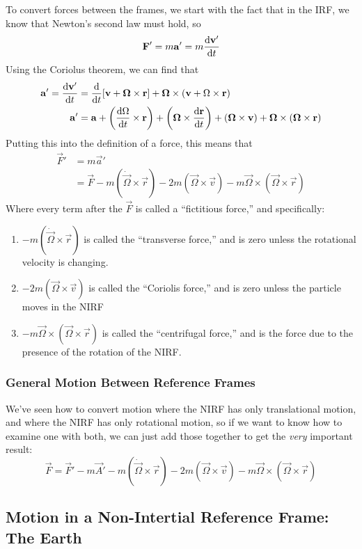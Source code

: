 \documentclass[a4paper]{article}
\begin{document}
To convert forces between the frames, we start with the fact that in the IRF,
we know that Newton's second law must hold, so
\[ \boldsymbol{\mathbf{F}}' = m\boldsymbol{\mathbf{a}}' = m\frac{\mathrm{d}\boldsymbol{\mathbf{v}}'}{\mathrm{d} t} \]
Using the Coriolus theorem, we can find that
\begin{align*}
	\boldsymbol{\mathbf{a}}' = \frac{\mathrm{d} \boldsymbol{\mathbf{v}}'}{\mathrm{d} t} &= \frac{\mathrm{d}}{\mathrm{d} t}[\boldsymbol{\mathbf{v}}+\boldsymbol{\mathbf{\Omega}}
	\times\boldsymbol{\mathbf{r}}]+\boldsymbol{\mathbf{\Omega}}\times(\boldsymbol{\mathbf{v}}+\Omega\times\boldsymbol{\mathbf{r}})\\
	\boldsymbol{\mathbf{a}}' &= \boldsymbol{\mathbf{a}} + \left(\frac{\mathrm{d} \Omega}{\mathrm{d} t}\times\boldsymbol{\mathbf{r}}\right)
	+\left(\boldsymbol{\mathbf{\Omega}}\times\frac{\mathrm{d} \boldsymbol{\mathbf{r}}}{\mathrm{d} t}\right)+(\boldsymbol{\mathbf{\Omega}}\times
	\boldsymbol{\mathbf{v}}) + \boldsymbol{\mathbf{\Omega}}\times(\boldsymbol{\mathbf{\Omega}}\times\boldsymbol{\mathbf{r}})
\end{align*}
Putting this into the definition of a force, this means that
\begin{align*}
	\vec{F}' &= m\vec{a}'\\
		 &= \vec{F} - m(\dot{\vec{\Omega}}\times\vec{r}) - 2m(
		\vec{\Omega}\times\vec{v}) - m\vec{\Omega}\times(
		\vec{\Omega}\times\vec{r})
\end{align*}
Where every term after the $\vec{F}$ is called a ``fictitious force,'' and
specifically:
\begin{enumerate}
	\item \(-m(\dot{\vec{\Omega}}\times\vec{r})\) is called the
		``transverse force,'' and is zero unless the rotational
		velocity is changing.
	\item \(-2m(\vec{\Omega}\times\vec{v})\) is called the ``Coriolis
		force,'' and is zero unless the particle moves in the
		NIRF
	\item \(-m\vec{\Omega}\times(\vec{\Omega}\times\vec{r})\) is called the
		``centrifugal force,'' and is the force due to the presence
		of the rotation of the NIRF.
\end{enumerate}

\subsubsection{General Motion Between Reference Frames}
We've seen how to convert motion where the NIRF has only translational motion,
and where the NIRF has only rotational motion, so if we want to know how to
examine one with both, we can just add those together to get the \emph{very}
important result:
\[ \vec{F} = \vec{F}'-m\vec{A}'-m(\dot{\vec{\Omega}}\times\vec{r}) -
	2m(\vec{\Omega}\times\vec{v})-m\vec{\Omega}\times(\vec{\Omega}\times
	\vec{r}) \]

\subsection{Motion in a Non-Intertial Reference Frame: The Earth}
\end{document}
